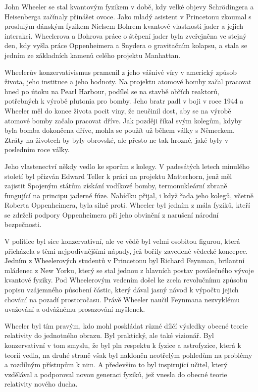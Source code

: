   John Wheeler se stal kvantovým fyzikem v době, kdy velké objevy Schrödingera a Heisenberga
  začínaly přinášet ovoce. Jako mladý asistent v Princetonu zkoumal s proslulým dánským fyzikem
  Nielsem Bohrem kvantové vlastnosti jader a jejich interakci. Wheelerova a Bohrova práce o štěpení
  jader byla zveřejněna ve stejný den, kdy vyšla práce Oppenheimera a Snydera o gravitačním kolapsu,
  a stala se jedním ze základních kamenů celého projektu Manhattan. 

  Wheelerův konzervativismus pramenil z jeho vášnivé víry v americký způsob života, jeho instituce a
  jeho hodnoty. Na projektu atomové bomby začal pracovat hned po útoku na Pearl Harbour, podílel
  se na stavbě obřích reaktorů, potřebných k výrobě plutonia pro bomby. Jeho bratr padl v boji v
  roce 1944 a Wheeler měl do konce života pocit viny, že neučinil dost, aby se na výrobě atomové
  bomby začalo pracovat dříve. Jak později říkal svým kolegům, kdyby byla bomba dokončena dříve,
  mohla se použít už během války s Německem. Ztráty na životech by byly obrovské, ale přesto ne tak
  hrozné, jaké byly v posledním roce války. 

  Jeho vlastenectví někdy vedlo ke sporům s kolegy. V padesátých letech minulého století byl přizván
  Edward Teller k práci na projektu Matterhorn, jenž měl zajistit Spojeným státům získání vodíkové
  bomby, termonukleární zbraně fungující na principu jaderné fúze. Nabídku přijal, i když řada jeho
  kolegů, včetně Roberta Oppenheimera, byla silně proti. Wheeler byl jedním z mála fyziků, kteří se
  zdrželi podpory Oppenheimera při jeho obvinění z narušení národní bezpečnosti.

  V politice byl sice konzervativní, ale ve vědě byl velmi osobitou figurou, která přicházela s
  těmi nejpodivnějšími nápady, jež bořily zavedené vědecké koncepce. Jedním z Wheelerových studentů
  v Princetonu byl Richard Feynman, brilantní mládenec z New Yorku, který se stal jednou z hlavních
  postav poválečného vývoje kvantové fyziky. Pod Wheelerovým vedením došel ke zcela revolučnímu
  způsobu popisu vzájemného působení částic, který dával jasný návod k výpočtu jejich chování na
  pozadí prostoročasu. Právě Wheeler naučil Feynmana nezvyklému uvažování a odvážnému prosazování
  myšlenek. 

  Wheeler byl tím pravým, kdo mohl poskládat různé dílčí výsledky obecné teorie relativity do
  jednotného obrazu. Byl praktický, ale také vizionář. Byl konzervativní v tom smyslu, že byl pln
  respektu k fyzice a astrofyzice, která k teorii vedla, na druhé straně však byl nakloněn neotřelým
  pohledům na problémy a rozdílným přístupům k nim. A především to byl inspirující učitel, který
  vzdělával a podporoval novou generaci fyziků, jež vnesla do obecné teorie relativity nového ducha.

